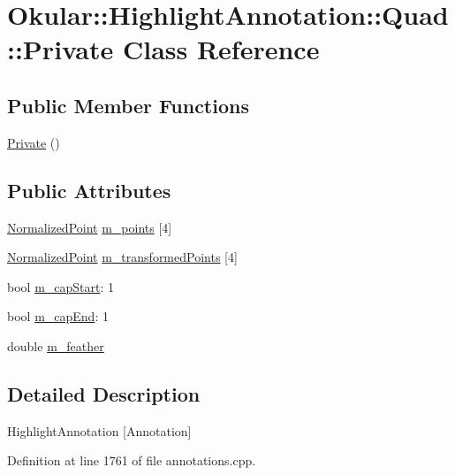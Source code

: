 \hypertarget{classHighlightAnnotation_1_1Quad_1_1Private}{\section{Okular\+:\+:Highlight\+Annotation\+:\+:Quad\+:\+:Private Class Reference}
\label{classHighlightAnnotation_1_1Quad_1_1Private}
}
\subsection*{Public Member Functions}
\begin{DoxyCompactItemize}
\item 
\hyperlink{classHighlightAnnotation_1_1Quad_1_1Private_a98d7e70232b9a13095bdbd0c991efcab}{Private} ()
\end{DoxyCompactItemize}
\subsection*{Public Attributes}
\begin{DoxyCompactItemize}
\item 
\hyperlink{classOkular_1_1NormalizedPoint}{Normalized\+Point} \hyperlink{classHighlightAnnotation_1_1Quad_1_1Private_a33ccf7c730e1aa0104fa245eacc073be}{m\+\_\+points} \mbox{[}4\mbox{]}
\item 
\hyperlink{classOkular_1_1NormalizedPoint}{Normalized\+Point} \hyperlink{classHighlightAnnotation_1_1Quad_1_1Private_a2c44540ba5195db18fd64c41b05639ed}{m\+\_\+transformed\+Points} \mbox{[}4\mbox{]}
\item 
bool \hyperlink{classHighlightAnnotation_1_1Quad_1_1Private_a89874cc544623ba223cad48ccb868700}{m\+\_\+cap\+Start}\+: 1
\item 
bool \hyperlink{classHighlightAnnotation_1_1Quad_1_1Private_afd27d64bf7ea84389192a19697b35a01}{m\+\_\+cap\+End}\+: 1
\item 
double \hyperlink{classHighlightAnnotation_1_1Quad_1_1Private_a9330edf17dee0457e183dfcaa1daf6e4}{m\+\_\+feather}
\end{DoxyCompactItemize}


\subsection{Detailed Description}
Highlight\+Annotation \mbox{[}Annotation\mbox{]} 

Definition at line 1761 of file annotations.\+cpp.



